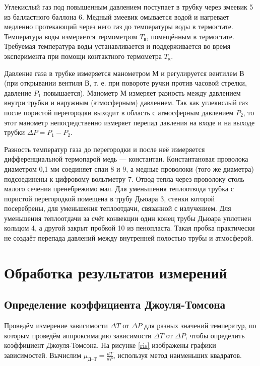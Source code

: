 \documentclass[12pt,a4paper]{article}
\begin{document}
Углекислый газ под повышенным давлением поступает в трубку через змеевик 5 из балластного баллона 6. 
Медный змеевик омывается водой и нагревает медленно протекающий через него газ до температуры воды в термостате. 
Температура воды измеряется термометром $T_в$, помещённым в термостате. 
Требуемая температура воды устанавливается и поддерживается во время эксперимента при помощи контактного термометра $T_к$.

Давление газа в трубке измеряется манометром М и регулируется вентилем В (при открывании вентиля В, т. е. при повороте ручки против часовой стрелки, давление $P_1$ повышается). 
Манометр М измеряет разность между давлением внутри трубки и наружным (атмосферным) давлением. Так как углекислый газ после пористой перегородки выходит в область с атмосферным давлением $P_2$, то этот манометр непосредственно измеряет перепад давления на входе и на выходе трубки $\Delta P = P_1 - P_2$.

Разность температур газа до перегородки и после неё измеряется дифференциальной термопарой медь — константан. 
Константановая проволока диаметром 0,1 мм соединяет спаи 8 и 9, а медные проволоки (того же диаметра) подсоединены к цифровому вольтметру 7. 
Отвод тепла через проволоку столь малого сечения пренебрежимо мал. 
Для уменьшения теплоотвода трубка с пористой перегородкой помещена в трубу Дьюара 3, стенки которой посеребрены, для уменьшения теплоотдачи, связанной с излучением. 
Для уменьшения теплоотдачи за счёт конвекции один конец трубы Дьюара уплотнен кольцом 4, а другой закрыт пробкой 10 из пенопласта. 
Такая пробка практически не создаёт перепада давлений между внутренней полостью трубы и атмосферой.

 
\section{Обработка результатов измерений}
\subsection{Определение коэффициента Джоуля-Томсона}

Проведём измерение зависимости $ \Delta T $ от $ \Delta P $ для разных значений температур, по которым проведём аппроксимацию зависимости $ \Delta T $ от $ \Delta P $, чтобы определить коэффициент Джоуля-Томсона. На рисунке \ref{ris} изображены графики зависимостей. Вычислим $ \mu_\text{Д--Т} = \frac{dT}{dP} $, используя метод наименьших квадратов.
\end{document}
